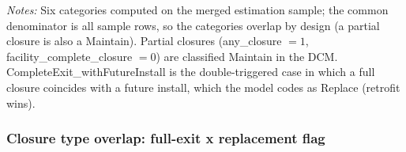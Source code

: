 \documentclass[
  11pt,
]{article}
\begin{document}
\begin{table}

\caption{\label{tbl-t011-a1}Action coding: 02b flags mapped to 04b DCM
actions}


\end{table}%

\vspace{0.1cm}
\begin{flushleft}
\footnotesize
\textit{Notes:} Six categories computed on the merged estimation sample; the common denominator is all sample rows, so the categories overlap by design (a partial closure is also a Maintain). Partial closures (any\_closure $=1$, facility\_complete\_closure $=0$) are classified Maintain in the DCM. CompleteExit\_withFutureInstall is the double-triggered case in which a full closure coincides with a future install, which the model codes as Replace (retrofit wins).
\end{flushleft}

\subsubsection{Closure type overlap: full-exit x replacement
flag}\label{sec-t011-a2}

\begin{table}

\caption{\label{tbl-t011-a2}Closure-type overlap: complete closure
\(\times\) replacement flag}


\end{table}%
\end{document}
